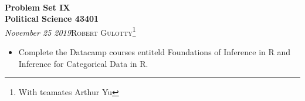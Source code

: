 \documentclass[12pt]{article}
\begin{document}
{\noindent\Huge\bf  \\[0.5\baselineskip] {\selectfont  Problem Set IX}         }\\[2\baselineskip] %
{ {\bf {}\selectfont Political Science 43401}\\ {\textit{\selectfont     November 25 2019}}}\hfill   {\large \textsc{Robert Gulotty}\footnote{With teamates Arthur Yu}} %
\\[1.4\baselineskip] 





\begin{itemize}
\item  Complete the Datacamp courses entiteld Foundations of Inference in R and Inference for Categorical Data in R.
\end{itemize}


 
\end{document}
